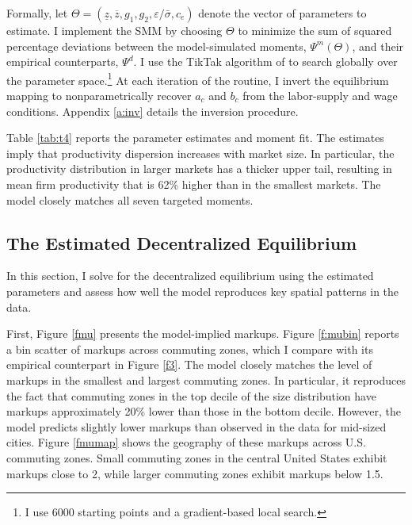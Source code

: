 Formally, let $\Theta=(\underline{z},\overline{z}, g_1, g_2, \varepsilon/\bar{\sigma}, c_e)$ denote the vector of parameters to estimate. I implement the SMM by choosing $\Theta$ to minimize the sum of squared percentage deviations between the model-simulated moments, $\Psi^m(\Theta)$, and their empirical counterparts, $\Psi^d$. I use the TikTak algorithm of \textcite{ArnoudGuvenen&Kleinberg19} to search globally over the parameter space.\footnote{I use 6000 starting points and a  gradient-based local search.} At each iteration of the routine, I invert the equilibrium mapping to nonparametrically recover $a_c$ and $b_c$ from the labor-supply and wage conditions. Appendix \ref{a:inv} details the inversion procedure.

Table \ref{tab:t4} reports the parameter estimates and moment fit. The estimates imply that productivity dispersion increases with market size. In particular, the productivity distribution in larger markets has a thicker upper tail, resulting in mean firm productivity that is 62\% higher than in the smallest markets. The model closely matches all seven targeted moments.

\subsection{The Estimated Decentralized Equilibrium}

In this section, I solve for the decentralized equilibrium using the estimated parameters and assess how well the model reproduces key spatial patterns in the data.

First, Figure \ref{fmu} presents the model-implied markups. Figure \ref{f:mubin} reports a bin scatter of markups across commuting zones, which I compare with its empirical counterpart in Figure \ref{f3}. The model closely matches the level of markups in the smallest and largest commuting zones. In particular, it reproduces the fact that commuting zones in the top decile of the size distribution have markups approximately 20\% lower than those in the bottom decile. However, the model predicts slightly lower markups than observed in the data for mid-sized cities. Figure \ref{fmumap} shows the geography of these markups across U.S. commuting zones. Small commuting zones in the central United States exhibit markups close to 2, while larger commuting zones exhibit markups below 1.5.

